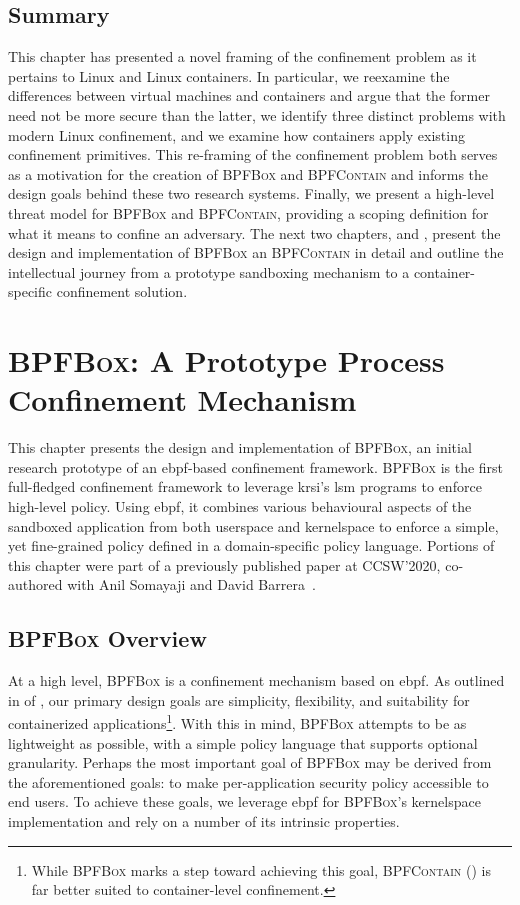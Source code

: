 \documentclass[
  fontsize=12pt,
  titlepage=firstiscover,
  paper=letter,
oneside,
  cleardoublepage=plain,
  parskip=half-,
  DIV=10,
  parindent,
  appendixprefix,
  chapterprefix,
  listof=totoc,
]{scrbook}
\newcommand{\bpfbox}{\textsc{BPFBox}}
\newcommand{\bpfcontain}{\textsc{BPFContain}}
\begin{document}
\section{Summary}

This chapter has presented a novel framing of the confinement problem as it pertains to
Linux and Linux containers. In particular, we reexamine the differences between virtual
machines and containers and argue that the former need not be more secure than the latter,
we identify three distinct problems with modern Linux confinement, and we examine how
containers apply existing confinement primitives. This re-framing of the confinement
problem both serves as a motivation for the creation of \bpfbox{} and \bpfcontain{} and
informs the design goals behind these two research systems. Finally, we present
a high-level threat model for \bpfbox{} and \bpfcontain{}, providing a scoping definition
for what it means to confine an adversary. The next two chapters,  and
, present the design and implementation of \bpfbox{} an \bpfcontain{}
in detail and outline the intellectual journey from a prototype sandboxing mechanism to
a container-specific confinement solution.
 
\chapter{\bpfbox: A Prototype Process Confinement Mechanism}\label{c:bpfbox}
This chapter presents the design and implementation of \bpfbox{}, an initial research
prototype of an \gls{ebpf}-based confinement framework. \bpfbox{} is the first
full-fledged confinement framework to leverage \gls{krsi}'s \gls{lsm} programs to enforce
high-level policy. Using \gls{ebpf}, it combines various behavioural aspects of the
sandboxed application from both userspace and kernelspace to enforce a simple, yet
fine-grained policy defined in a domain-specific policy language. Portions of this chapter
were part of a previously published paper at CCSW'2020, co-authored with Anil Somayaji and
David Barrera~\cite{findlay2020_bpfbox}.



\section{\bpfbox{} Overview}

At a high level, \bpfbox{} is a confinement mechanism based on \gls{ebpf}. As outlined in
 of , our primary design goals are
simplicity, flexibility, and suitability for containerized applications\footnote{While
\bpfbox{} marks a step toward achieving this goal, \bpfcontain{} () is far
better suited to container-level confinement.}. With this in mind, \bpfbox{} attempts to
be as lightweight as possible, with a simple policy language that supports optional
granularity. Perhaps the most important goal of \bpfbox{} may be derived from the
aforementioned goals: to make per-application security policy accessible to end users. To
achieve these goals, we leverage \gls{ebpf} for \bpfbox{}'s kernelspace implementation and
rely on a number of its intrinsic properties.
\end{document}
